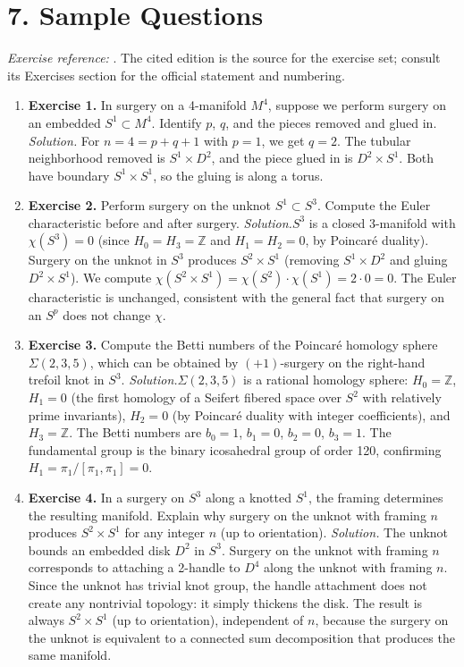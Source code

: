 \section*{7. Sample Questions}
\emph{Exercise reference:} \cite{surgery_ref1}. The cited edition is the source for the exercise set; consult its Exercises section for the official statement and numbering.
\begin{enumerate}[leftmargin=*,itemsep=0.9em]
\item \textbf{Exercise 1.} In surgery on a 4-manifold $M^4$, suppose we perform surgery on an embedded $S^1 \subset M^4$. Identify $p$, $q$, and the pieces removed and glued in. \emph{Solution.} For $n = 4 = p + q + 1$ with $p = 1$, we get $q = 2$. The tubular neighborhood removed is $S^1 \times D^2$, and the piece glued in is $D^2 \times S^1$. Both have boundary $S^1 \times S^1$, so the gluing is along a torus.

\item \textbf{Exercise 2.} Perform surgery on the unknot $S^1 \subset S^3$. Compute the Euler characteristic before and after surgery. \emph{Solution.}$S^3$ is a closed 3-manifold with $\chi(S^3) = 0$ (since $H_0 = H_3 = \mathbb{Z}$ and $H_1 = H_2 = 0$, by Poincaré duality). Surgery on the unknot in $S^3$ produces $S^2 \times S^1$ (removing $S^1 \times D^2$ and gluing $D^2 \times S^1$). We compute $\chi(S^2 \times S^1) = \chi(S^2) \cdot \chi(S^1) = 2 \cdot 0 = 0$. The Euler characteristic is unchanged, consistent with the general fact that surgery on an $S^p$ does not change $\chi$.

\item \textbf{Exercise 3.} Compute the Betti numbers of the Poincaré homology sphere $\Sigma(2,3,5)$, which can be obtained by $(+1)$-surgery on the right-hand trefoil knot in $S^3$. \emph{Solution.}$\Sigma(2,3,5)$ is a rational homology sphere: $H_0 = \mathbb{Z}$, $H_1 = 0$ (the first homology of a Seifert fibered space over $S^2$ with relatively prime invariants), $H_2 = 0$ (by Poincaré duality with integer coefficients), and $H_3 = \mathbb{Z}$. The Betti numbers are $b_0 = 1$, $b_1 = 0$, $b_2 = 0$, $b_3 = 1$. The fundamental group is the binary icosahedral group of order 120, confirming $H_1 = \pi_1/[\pi_1, \pi_1] = 0$.

\item \textbf{Exercise 4.} In a surgery on $S^3$ along a knotted $S^1$, the framing determines the resulting manifold. Explain why surgery on the unknot with framing $n$ produces $S^2 \times S^1$ for any integer $n$ (up to orientation). \emph{Solution.} The unknot bounds an embedded disk $D^2$ in $S^3$. Surgery on the unknot with framing $n$ corresponds to attaching a 2-handle to $D^4$ along the unknot with framing $n$. Since the unknot has trivial knot group, the handle attachment does not create any nontrivial topology: it simply thickens the disk. The result is always $S^2 \times S^1$ (up to orientation), independent of $n$, because the surgery on the unknot is equivalent to a connected sum decomposition that produces the same manifold.


\end{enumerate}
